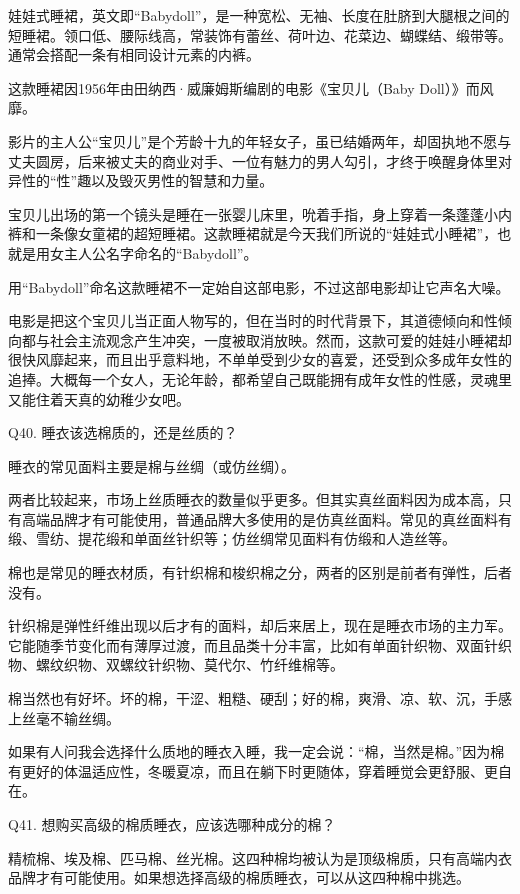 \documentclass[12pt,UTF8]{ctexbook}
\begin{document}
娃娃式睡裙，英文即“Babydoll”，是一种宽松、无袖、长度在肚脐到大腿根之间的短睡裙。领口低、腰际线高，常装饰有蕾丝、荷叶边、花菜边、蝴蝶结、缎带等。通常会搭配一条有相同设计元素的内裤。

这款睡裙因1956年由田纳西·威廉姆斯编剧的电影《宝贝儿（Baby Doll）》而风靡。

影片的主人公“宝贝儿”是个芳龄十九的年轻女子，虽已结婚两年，却固执地不愿与丈夫圆房，后来被丈夫的商业对手、一位有魅力的男人勾引，才终于唤醒身体里对异性的“性”趣以及毁灭男性的智慧和力量。

宝贝儿出场的第一个镜头是睡在一张婴儿床里，吮着手指，身上穿着一条蓬蓬小内裤和一条像女童裙的超短睡裙。这款睡裙就是今天我们所说的“娃娃式小睡裙”，也就是用女主人公名字命名的“Babydoll”。

用“Babydoll”命名这款睡裙不一定始自这部电影，不过这部电影却让它声名大噪。

电影是把这个宝贝儿当正面人物写的，但在当时的时代背景下，其道德倾向和性倾向都与社会主流观念产生冲突，一度被取消放映。然而，这款可爱的娃娃小睡裙却很快风靡起来，而且出乎意料地，不单单受到少女的喜爱，还受到众多成年女性的追捧。大概每一个女人，无论年龄，都希望自己既能拥有成年女性的性感，灵魂里又能住着天真的幼稚少女吧。





Q40. 睡衣该选棉质的，还是丝质的？


睡衣的常见面料主要是棉与丝绸（或仿丝绸）。

两者比较起来，市场上丝质睡衣的数量似乎更多。但其实真丝面料因为成本高，只有高端品牌才有可能使用，普通品牌大多使用的是仿真丝面料。常见的真丝面料有缎、雪纺、提花缎和单面丝针织等；仿丝绸常见面料有仿缎和人造丝等。

棉也是常见的睡衣材质，有针织棉和梭织棉之分，两者的区别是前者有弹性，后者没有。

针织棉是弹性纤维出现以后才有的面料，却后来居上，现在是睡衣市场的主力军。它能随季节变化而有薄厚过渡，而且品类十分丰富，比如有单面针织物、双面针织物、螺纹织物、双螺纹针织物、莫代尔、竹纤维棉等。

棉当然也有好坏。坏的棉，干涩、粗糙、硬刮；好的棉，爽滑、凉、软、沉，手感上丝毫不输丝绸。

如果有人问我会选择什么质地的睡衣入睡，我一定会说：“棉，当然是棉。”因为棉有更好的体温适应性，冬暖夏凉，而且在躺下时更随体，穿着睡觉会更舒服、更自在。





Q41. 想购买高级的棉质睡衣，应该选哪种成分的棉？


精梳棉、埃及棉、匹马棉、丝光棉。这四种棉均被认为是顶级棉质，只有高端内衣品牌才有可能使用。如果想选择高级的棉质睡衣，可以从这四种棉中挑选。
\end{document}
